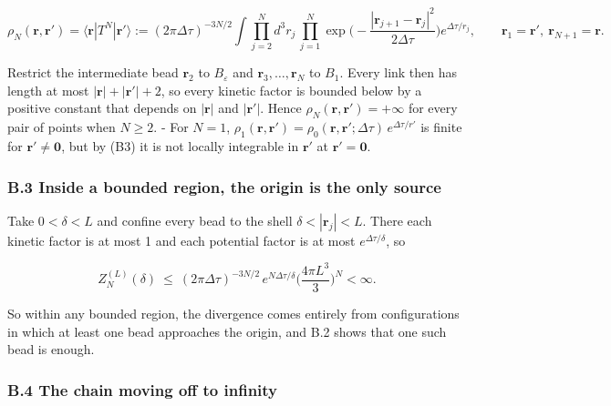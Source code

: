 \documentclass[11pt,a4paper]{article}
\newcommand{\tagmark}[1]{\marginnote{\scriptsize\ttfamily #1}}
\begin{document}
\begin{equation}
\rho_N(\mathbf r,\mathbf r')=\langle\mathbf r|T^N|\mathbf r'\rangle:=(2\pi\Delta\tau)^{-3N/2}\int\prod_{j=2}^{N}d^3r_j\,\prod_{j=1}^{N}\exp\Big(-\frac{|\mathbf r_{j+1}-\mathbf r_j|^2}{2\Delta\tau}\Big)e^{\Delta\tau/r_j},\qquad\mathbf r_1=\mathbf r',\ \mathbf r_{N+1}=\mathbf r .\tag{B10}
\end{equation}

Restrict the intermediate bead \(\mathbf r_2\) to \(B_\varepsilon\) and \(\mathbf r_3,\dots,\mathbf r_N\) to \(B_1\). Every link then has length at most \(|\mathbf r|+|\mathbf r'|+2\), so every kinetic factor is bounded below by a positive constant that depends on \(|\mathbf r|\) and \(|\mathbf r'|\). Hence \(\rho_N(\mathbf r,\mathbf r')=+\infty\) for every pair of points when \(N\ge2\).
- For \(N=1\), \(\rho_1(\mathbf r,\mathbf r')=\rho_0(\mathbf r,\mathbf r';\Delta\tau)\,e^{\Delta\tau/r'}\) is finite for \(\mathbf r'\ne\mathbf 0\), but by (B3) it is not locally integrable in \(\mathbf r'\) at \(\mathbf r'=\mathbf 0\).

\hypertarget{b.3-inside-a-bounded-region-the-origin-is-the-only-source}{%
\subsubsection{B.3 Inside a bounded region, the origin is the only source}\label{b.3-inside-a-bounded-region-the-origin-is-the-only-source}}

\tagmark{[D]} Take \(0<\delta<L\) and confine every bead to the shell \(\delta<|\mathbf r_j|<L\). There each kinetic factor is at most 1 and each potential factor is at most \(e^{\Delta\tau/\delta}\), so

\begin{equation}
Z_N^{(L)}(\delta)\ \le\ (2\pi\Delta\tau)^{-3N/2}\,e^{N\Delta\tau/\delta}\Big(\frac{4\pi L^3}{3}\Big)^N<\infty .\tag{B11}
\end{equation}

So within any bounded region, the divergence comes entirely from configurations in which at least one bead approaches the origin, and B.2 shows that one such bead is enough.

\hypertarget{b.4-the-chain-moving-off-to-infinity}{%
\subsubsection{B.4 The chain moving off to infinity}\label{b.4-the-chain-moving-off-to-infinity}}
\end{document}
